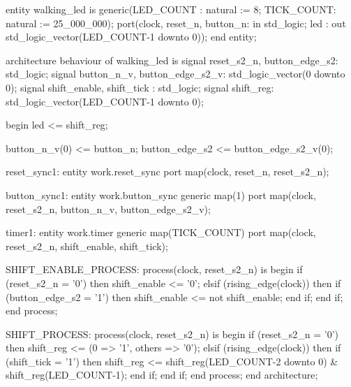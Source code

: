 \begin{vhdlcode}
entity walking_led is
    generic(LED_COUNT : natural := 8;
            TICK_COUNT: natural := 25_000_000);
    port(clock, reset_n, button_n: in std_logic;
         led                     : out std_logic_vector(LED_COUNT-1 downto 0));
end entity;

architecture behaviour of walking_led is
signal reset_s2_n, button_edge_s2: std_logic;
signal button_n_v, button_edge_s2_v: std_logic_vector(0 downto 0);
signal shift_enable, shift_tick  : std_logic;
signal shift_reg: std_logic_vector(LED_COUNT-1 downto 0);

begin
    led <= shift_reg;

    button_n_v(0)     <= button_n;
    button_edge_s2 <= button_edge_s2_v(0);

    reset_sync1: entity work.reset_sync
        port map(clock, reset_n, reset_s2_n);

    button_sync1: entity work.button_sync
        generic map(1)
        port map(clock, reset_s2_n, button_n_v, button_edge_s2_v);

    timer1: entity work.timer
        generic map(TICK_COUNT)
        port map(clock, reset_s2_n, shift_enable, shift_tick);

    SHIFT_ENABLE_PROCESS: process(clock, reset_s2_n) is
    begin
        if (reset_s2_n = '0') then
            shift_enable <= '0';
        elsif (rising_edge(clock)) then
            if (button_edge_s2 = '1') then
                shift_enable <= not shift_enable;
            end if;
        end if;
    end process;

    SHIFT_PROCESS: process(clock, reset_s2_n) is
    begin
        if (reset_s2_n = '0') then
            shift_reg <= (0 => '1', others => '0');
        elsif (rising_edge(clock)) then
            if (shift_tick = '1') then
                shift_reg <= shift_reg(LED_COUNT-2 downto 0) & shift_reg(LED_COUNT-1);
            end if;
        end if;
    end process;
end architecture;
\end{vhdlcode}

